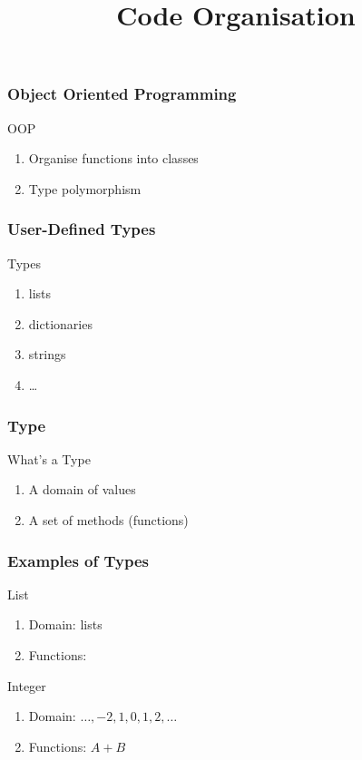 
\title{Code Organisation}


\begin{frame}[fragile] %
\frametitle{Object Oriented Programming}

\begin{block}{OOP}
\begin{enumerate}
\item Organise functions into classes
\item Type polymorphism
\end{enumerate}
\end{block}
\end{frame}

\begin{frame}[fragile] %
\frametitle{User-Defined Types}

\begin{block}{Types}
\begin{enumerate}
\item lists
\item dictionaries
\item strings
\item \ldots
\end{enumerate}
\end{block}
\end{frame}

\begin{frame}[fragile] %
\frametitle{Type}
\begin{block}{What's a Type}
\begin{enumerate}
\item A domain of values
\item A set of methods (functions)
\end{enumerate}
\end{block}

\end{frame}

\begin{frame}[fragile] %
\frametitle{Examples of Types}

\begin{block}{List}
\begin{enumerate}
\item Domain: lists
\item Functions: 
\end{enumerate}
\end{block}

\pause
\begin{block}{Integer}
\begin{enumerate}
\item Domain: $\dots,-2, 1, 0, 1, 2, \dots$
\item Functions: $A + B$
\end{enumerate}
\end{block}
\end{frame}

